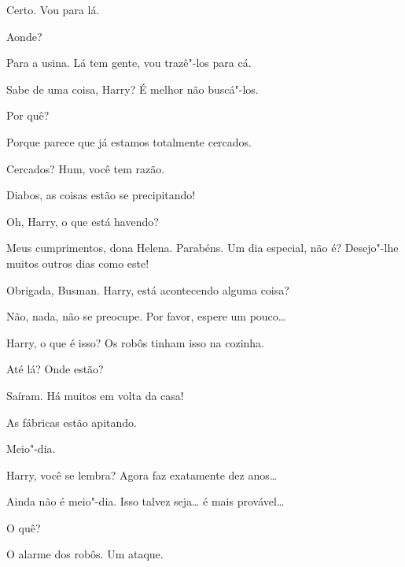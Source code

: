  Certo.  Vou para lá.

 Aonde?

 Para a usina. Lá tem gente, vou trazê"-los para cá.

 Sabe de uma coisa, Harry? É melhor não \mbox{buscá"-los}.

 Por quê?

 Porque parece que já estamos totalmente \mbox{cercados}.

 Cercados?  Hum, você tem razão.

 Diabos, as coisas estão se precipitando! 

 Oh, Harry, o que está havendo?

  Meus cumprimentos, dona Helena. Parabéns. Um dia
especial, não é? Desejo"-lhe muitos outros dias como este!

 Obrigada, Busman. Harry, está acontecendo alguma coisa?

 Não, nada, não se preocupe. Por favor, espere um pouco\ldots{}

 Harry, o que é isso?  Os robôs tinham isso na cozinha.

 Até lá? Onde estão?

 Saíram. Há muitos em volta da casa!

 As fábricas estão apitando.

 Meio"-dia.

 Harry, você se lembra? Agora faz exatamente dez anos\ldots{}

  Ainda não é meio"-dia. Isso talvez seja\ldots{} é mais
provável\ldots{}

 O quê?

 O alarme dos robôs. Um ataque.




\chapter[Ato \textsc{ii}]{}
\newact
\thispagestyle{empty}

